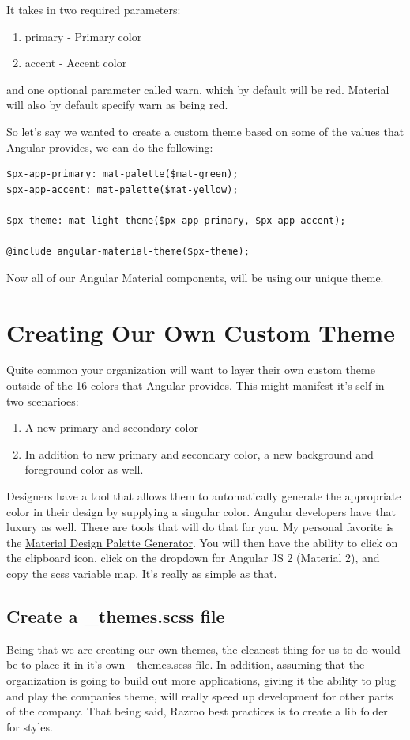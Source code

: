 It takes in two required parameters: 
\begin{enumerate}
  \item primary - Primary color
  \item accent - Accent color 
\end{enumerate}
and one optional parameter called warn, which by default will be red. Material 
will also by default specify warn as being red. 

So let's say we wanted to create a custom theme based on some of the values 
that Angular provides, we can do the following: 

\begin{lstlisting}
$px-app-primary: mat-palette($mat-green);
$px-app-accent: mat-palette($mat-yellow);

$px-theme: mat-light-theme($px-app-primary, $px-app-accent);

@include angular-material-theme($px-theme);
\end{lstlisting}

Now all of our Angular Material components, will be using our unique theme.

\section{Creating Our Own Custom Theme}
Quite common your organization will want to layer their own custom theme 
outside of the 16 colors that Angular provides. This might manifest it's 
self in two scenarioes: 
\begin{enumerate}
  \item A new primary and secondary color
  \item In addition to new primary and secondary color, a new background and 
  foreground color as well. 
\end{enumerate}

Designers have a tool that allows them to automatically generate the appropriate
color in their design by supplying a singular color. Angular developers have
that luxury as well. There are tools that will do that for you. My personal 
favorite is the \href{http://mcg.mbitson.com}{Material Design Palette Generator}.
You will then have the ability to click on the clipboard icon, click on the 
dropdown for Angular JS 2 (Material 2), and copy the scss variable map. It's 
really as simple as that. 

\subsection{Create a \_themes.scss file}
Being that we are creating our own themes, the cleanest thing for us to do would 
be to place it in it's own \_themes.scss file. In addition, assuming that the 
organization is going to build out more applications, giving it the ability to
plug and play the companies theme, will really speed up development for other
parts of the company. That being said, Razroo best practices is to create a lib
folder for styles.

